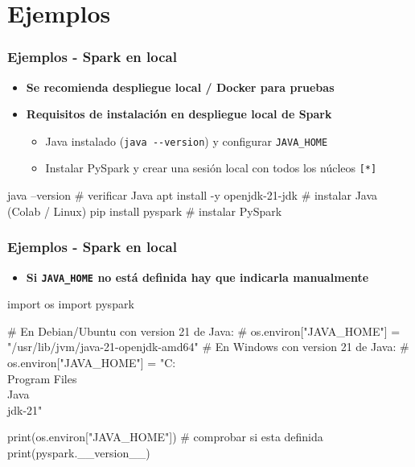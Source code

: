 \documentclass[aspectratio=169]{beamer}
\begin{document}
\section{Ejemplos}

\begin{frame}[fragile]\frametitle{Ejemplos - Spark en local}
\begin{itemize}
	\item \textbf{Se recomienda despliegue local / Docker para pruebas}

	\vspace{1em}

	\item \textbf{Requisitos de instalación en despliegue local de Spark}
	\begin{itemize}
		\item Java instalado (\texttt{java -{}-version}) y configurar \texttt{JAVA\_HOME}
		\item Instalar PySpark y crear una sesión local con todos los núcleos \texttt{[*]}
	\end{itemize}
\end{itemize}

\vspace{1em}

\begin{shellbox}
\begin{shcode}
java --version                     # verificar Java
apt install -y openjdk-21-jdk      # instalar Java (Colab / Linux)
pip install pyspark                # instalar PySpark
\end{shcode}
\end{shellbox}
\end{frame}



\begin{frame}[fragile]\frametitle{Ejemplos - Spark en local}
\begin{itemize}
  \item \textbf{Si \texttt{JAVA\_HOME} no está definida hay que indicarla manualmente}
\end{itemize}

\vspace{0.5em}

\begin{code}
\begin{python3code}
import os
import pyspark

# En Debian/Ubuntu con version 21 de Java:
# os.environ["JAVA_HOME"] = "/usr/lib/jvm/java-21-openjdk-amd64"
# En Windows con version 21 de Java:
# os.environ["JAVA_HOME"] = "C:\\Program Files\\Java\\jdk-21"

print(os.environ["JAVA_HOME"])   # comprobar si esta definida
print(pyspark.__version__)
\end{python3code}
\end{code}
\end{frame}
\end{document}
